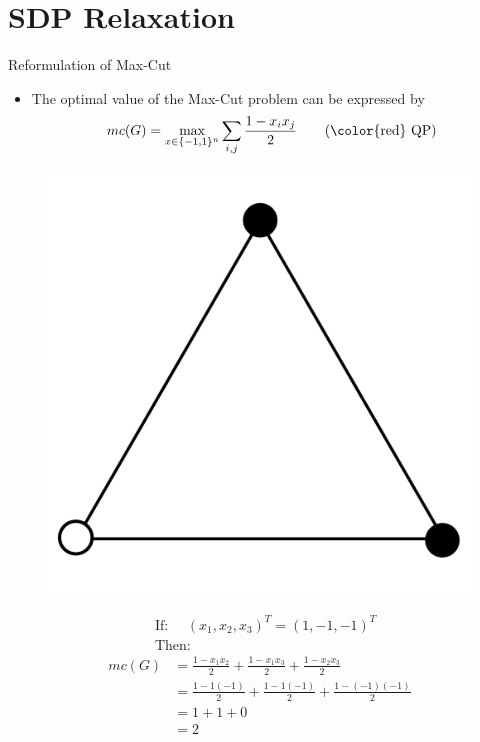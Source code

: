 \documentclass[10pt, xcolor={dvipsnames}]{beamer}
\begin{document}
\section{SDP Relaxation}

\begin{frame}{Reformulation of Max-Cut}
\begin{itemize}
\item The optimal value of the Max-Cut problem can be expressed by
\begin{equation}
mc(G) =\max_{x \in \lbrace -1, 1 \rbrace^{n}} \sum_{i, j} \frac{1 - x_{i} x_{j}}{2}
\tag{{\color{red} QP}}
\end{equation}
\end{itemize}
\begin{example}[$K_{3}$]
\begin{minipage}[t]{0.3\textwidth}
\vspace{1cm}
\begin{figure}
\includegraphics[width=.5\textwidth]{../figures/k3.pdf}
\end{figure}
\end{minipage}%
\begin{minipage}[t]{0.5\textwidth}
\vspace{2mm}
\begin{align*}
&\text{If: } \quad
(x_1, x_2, x_3)^{T} = (1, -1, -1)^{T} \\
&\text{Then: }
\end{align*}
\begin{align*}
mc(G) &= \frac{1 - x_1 x_2}{2} + 
\frac{1 - x_1 x_3}{2} +
\frac{1 - x_2 x_3}{2} \\
&= 
\frac{1 - 1 (-1)}{2} + 
\frac{1 - 1 (-1)}{2} +
\frac{1 - (-1) (-1)}{2} \\
&= 1 + 1 + 0\\
&= 2
\end{align*}
\end{minipage}
\end{example}
\end{frame}
\end{document}
